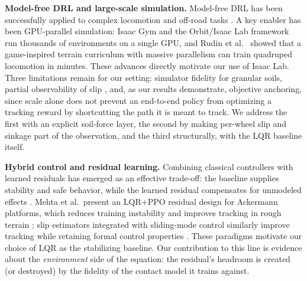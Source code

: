 \documentclass[conference]{IEEEtran}
\begin{document}
\vspace{2mm}
\noindent\textbf{Model-free DRL and large-scale simulation.} Model-free DRL has been successfully applied to complex locomotion and off-road tasks \cite{wiberg2021rough, gunma2024sac, lee2020learning}. A key enabler has been GPU-parallel simulation: Isaac Gym \cite{makoviychuk2021isaac} and the Orbit/Isaac Lab framework \cite{mittal2023orbit} run thousands of environments on a single GPU, and Rudin et al.\ \cite{rudin2022learning} showed that a game-inspired terrain curriculum with massive parallelism can train quadruped locomotion in minutes. These advances directly motivate our use of Isaac Lab. Three limitations remain for our setting: simulator fidelity for granular soils, partial observability of slip \cite{alcayaga2025lstm}, and, as our results demonstrate, objective anchoring, since scale alone does not prevent an end-to-end policy from optimizing a tracking reward by shortcutting the path it is meant to track. We address the first with an explicit soil-force layer, the second by making per-wheel slip and sinkage part of the observation, and the third structurally, with the LQR baseline itself.

\vspace{2mm}
\noindent\textbf{Hybrid control and residual learning.} Combining classical controllers with learned residuals has emerged as an effective trade-off: the baseline supplies stability and safe behavior, while the learned residual compensates for unmodeled effects \cite{johannink2019residual, silver2018residual}. Mehta et al.\ present an LQR{+}PPO residual design for Ackermann platforms, which reduces training instability and improves tracking in rough terrain \cite{mehta2024hybrid}; slip estimators integrated with sliding-mode control similarly improve tracking while retaining formal control properties \cite{nourizadeh2023sliding}. These paradigms motivate our choice of LQR as the stabilizing baseline. Our contribution to this line is evidence about the \emph{environment} side of the equation: the residual's headroom is created (or destroyed) by the fidelity of the contact model it trains against.
\end{document}
